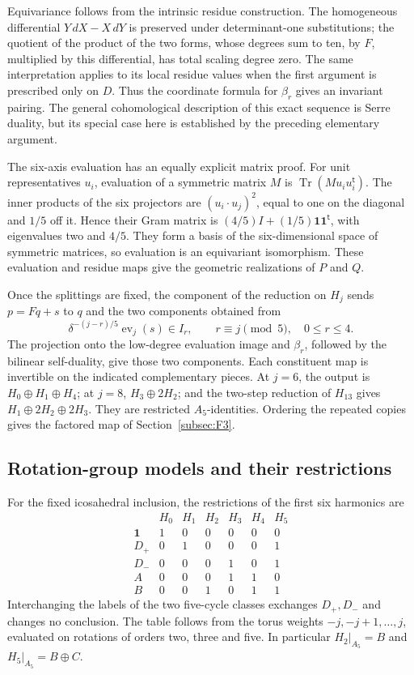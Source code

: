 \documentclass[11pt,a4paper]{article}
\begin{document}
Equivariance follows from the intrinsic residue construction. The homogeneous differential \(Y\,dX-X\,dY\) is preserved under determinant-one substitutions; the quotient of the product of the two forms, whose degrees sum to ten, by \(F\), multiplied by this differential, has total scaling degree zero. The same interpretation applies to its local residue values when the first argument is prescribed only on \(D\). Thus the coordinate formula for \(\beta_r\) gives an invariant pairing. The general cohomological description of this exact sequence is Serre duality, but its special case here is established by the preceding elementary argument.

The six-axis evaluation has an equally explicit matrix proof. For unit representatives \(u_i\), evaluation of a symmetric matrix \(M\) is \(\operatorname{Tr}(M u_i u_i^{\mathsf t})\). The inner products of the six projectors are \((u_i\cdot u_j)^2\), equal to one on the diagonal and \(1/5\) off it. Hence their Gram matrix is \((4/5)I+(1/5)\boldsymbol1\boldsymbol1^{\mathsf t}\), with eigenvalues two and \(4/5\). They form a basis of the six-dimensional space of symmetric matrices, so evaluation is an equivariant isomorphism. These evaluation and residue maps give the geometric realizations of \(P\) and \(Q\).

Once the splittings are fixed, the component of the reduction on \(H_j\) sends \(p=Fq+s\) to \(q\) and the two components obtained from
\[
\delta^{-(j-r)/5}\operatorname{ev}_j(s)\in I_r,
\qquad r\equiv j\pmod5,\quad0\leq r\leq4.
\]
The projection onto the low-degree evaluation image and \(\beta_r\), followed by the bilinear self-duality, give those two components. Each constituent map is invertible on the indicated complementary pieces. At \(j=6\), the output is \(H_0\oplus H_1\oplus H_4\); at \(j=8\), \(H_3\oplus2H_2\); and the two-step reduction of \(H_{13}\) gives \(H_1\oplus2H_2\oplus2H_3\). They are restricted \(A_5\)-identities. Ordering the repeated copies gives the factored map of Section~\ref{subsec:F3}.

\subsection{Rotation-group models and their restrictions}\label{subsec:F7}

For the fixed icosahedral inclusion, the restrictions of the first six harmonics are
\[
\begin{array}{c|rrrrrr}
&H_0&H_1&H_2&H_3&H_4&H_5\\\hline
\mathbf1&1&0&0&0&0&0\\
D_+&0&1&0&0&0&1\\
D_-&0&0&0&1&0&1\\
A&0&0&0&1&1&0\\
B&0&0&1&0&1&1
\end{array}
\]
Interchanging the labels of the two five-cycle classes exchanges $D_+,D_-$ and changes no conclusion. The table follows from the torus weights $-j,-j+1,\ldots,j$, evaluated on rotations of orders two, three and five. In particular $H_2|_{A_5}=B$ and $H_5|_{A_5}=B\oplus C$.
\end{document}
